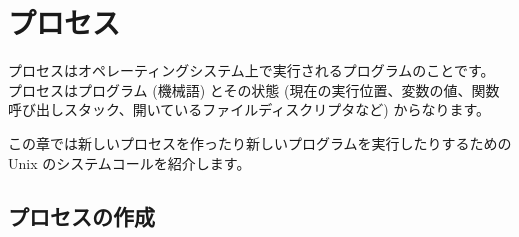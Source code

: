 %
%

\chapter{\label{sec/processes}プロセス}

プロセスはオペレーティングシステム上で実行されるプログラムのことです。
プロセスはプログラム (機械語) とその状態 (現在の実行位置、変数の値、関数呼び出しスタック、開いているファイルディスクリプタなど)
からなります。

この章では新しいプロセスを作ったり新しいプログラムを実行したりするための Unix のシステムコールを紹介します。

\section{プロセスの作成}

